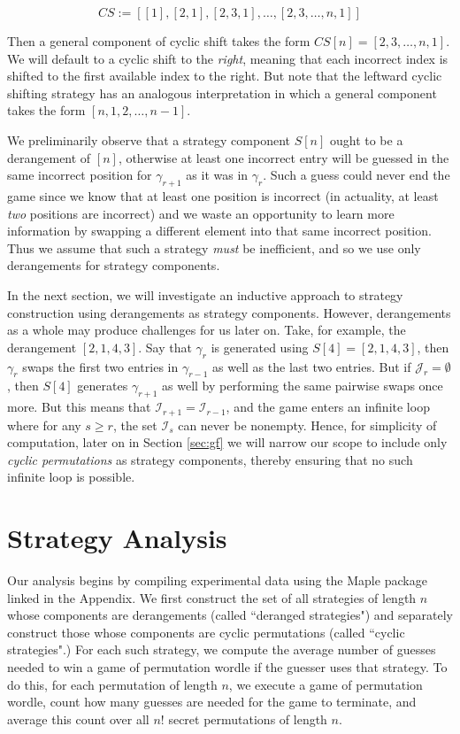 \documentclass[article]{amsart}
\theoremstyle{definition}
\theoremstyle{definition}
\theoremstyle{remark}
\begin{document}
\[ CS := \left[ [1], [2,1], [2,3,1], \dots, [2,3,\dots, n, 1] \right] \]

\vspace{0.5cm}

Then a general component of cyclic shift takes the form $CS[n] = [2,3,\dots, n,1]$. We will default to a cyclic shift to the \textit{right}, meaning that each incorrect index is shifted to the first available index to the right. But note that the leftward cyclic shifting strategy has an analogous interpretation in which a general component takes the form $[n,1,2,\dots,n-1]$. 

We preliminarily observe that a strategy component $S[n]$ ought to be a derangement of $[n]$, otherwise at least one incorrect entry will be guessed in the same incorrect position for $\gamma_{r+1}$ as it was in $\gamma_r$. Such a guess could never end the game since we know that at least one position is incorrect (in actuality, at least \textit{two} positions are incorrect) and we waste an opportunity to learn more information by swapping a different element into that same incorrect position. Thus we assume that such a strategy \textit{must} be inefficient, and so we use only derangements for strategy components. 

In the next section, we will investigate an inductive approach to strategy construction using derangements as strategy components. However, derangements as a whole may produce challenges for us later on. Take, for example, the derangement $[2,1,4,3]$. Say that $\gamma_r$ is generated using $S[4] = [2,1,4,3]$, then $\gamma_r$ swaps the first two entries in $\gamma_{r-1}$ as well as the last two entries. But if $\mathcal{J}_r = \emptyset$, then $S[4]$ generates $\gamma_{r+1}$ as well by performing the same pairwise swaps once more. But this means that $\mathcal{I}_{r+1} = \mathcal{I}_{r-1}$, and the game enters an infinite loop where for any $s \geq r$, the set $\mathcal{I}_s$ can never be nonempty. Hence, for simplicity of computation, later on in Section \ref{sec:gf} we will narrow our scope to include only \textit{cyclic permutations} as strategy components, thereby ensuring that no such infinite loop is possible.



\section{Strategy Analysis} \label{sec:stratanal}

Our analysis begins by compiling experimental data using the Maple package linked in the Appendix. We first construct the set of all strategies of length $n$ whose components are derangements (called ``deranged strategies") and separately construct those whose components are cyclic permutations (called ``cyclic strategies".) For each such strategy, we compute the average number of guesses needed to win a game of permutation wordle if the guesser uses that strategy. To do this, for each permutation of length $n$, we execute a game of permutation wordle, count how many guesses are needed for the game to terminate, and average this count over all $n!$ secret permutations of length $n$. 
\end{document}
